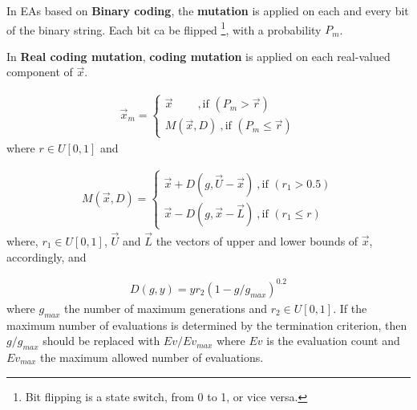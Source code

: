 In EAs based on {\bf Binary coding}, the {\bf mutation} is applied on each and every bit of the binary string. Each bit ca be flipped \footnote{Bit flipping is a state switch, from 0 to 1, or vice versa.}, with a probability $P_m$.      

\begin{figure}[h!]
\begin{minipage}[b]{1\linewidth}
 \centering
\end{minipage}
\label{binarymut}
\end{figure}

\pagebreak
In {\bf Real coding mutation}, {\bf coding mutation} is applied on each real-valued component of $\vec{x}$. 

\begin{eqnarray}
	\vec{x}_m={\left\{ 
	\begin{array}{ll}
    \vec{x}~~~~~~~~~~,\mbox{if $(P_m > \vec{r})$}\\
	M(\vec{x},D)~,\mbox{if $(P_m \leq \vec{r})$}
    \end{array} \right. }
    \label{}
\end{eqnarray}
where $r\in U[0,1]$ and

\begin{eqnarray}
	M(\vec{x},D)={\left\{ 
	\begin{array}{ll}
    \vec{x}+D(g,\vec{U}-\vec{x})~,\mbox{if $(r_1 > 0.5)$}\\
	\vec{x}-D(g,\vec{x}-\vec{L})~,\mbox{if $(r_1 \leq r)$}
    \end{array} \right. }
    \label{}
\end{eqnarray}
where, $r_1\in U[0,1]$, $\vec{U}$ and $\vec{L}$ the vectors of upper and lower bounds of $\vec{x}$, accordingly, and  

\begin{eqnarray}
   D(g,y) = y r_2 (1-g/g_{max})^{0.2}
\end{eqnarray}
where $g_{max}$ the number of maximum generations and $r_2\in U[0,1]$. If the maximum number of evaluations is determined by the termination criterion, then $g/g_{max}$ should be replaced with $Ev/Ev_{max}$ where $Ev$ is the evaluation count and $Ev_{max}$ the maximum allowed number of evaluations.  


